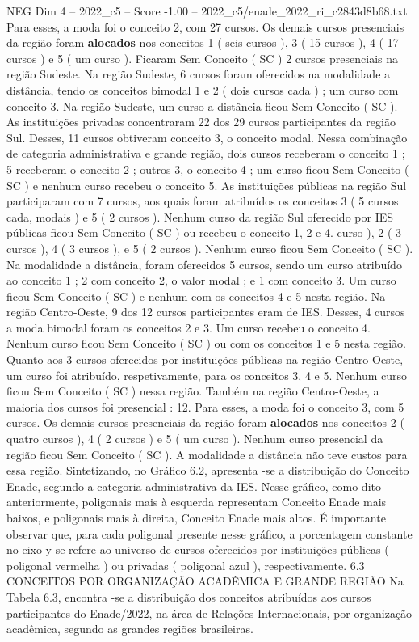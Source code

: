 \begin{textsample}{NEG Dim 4 – 2022\_c5 – Score -1.00 – 2022\_c5/enade\_2022\_ri\_c2843d8b68.txt}
Para esses, a moda foi o conceito 2, com 27 cursos.
Os demais cursos presenciais da região foram \textbf{alocados} nos conceitos 1 ( seis cursos ), 3 ( 15 cursos ), 4 ( 17 cursos ) e 5 ( um curso ).
Ficaram Sem Conceito ( SC ) 2 cursos presenciais na região Sudeste.
Na região Sudeste, 6 cursos foram oferecidos na modalidade a distância, tendo os conceitos bimodal 1 e 2 ( dois cursos cada ) ; um curso com conceito 3.
Na região Sudeste, um curso a distância ficou Sem Conceito ( SC ).
As instituições privadas concentraram 22 dos 29 cursos participantes da região Sul.
Desses, 11 cursos obtiveram conceito 3, o conceito modal.
Nessa combinação de categoria administrativa e grande região, dois cursos receberam o conceito 1 ; 5 receberam o conceito 2 ; outros 3, o conceito 4 ; um curso ficou Sem Conceito ( SC ) e nenhum curso recebeu o conceito 5.
As instituições públicas na região Sul participaram com 7 cursos, aos quais foram atribuídos os conceitos 3 ( 5 cursos cada, modais ) e 5 ( 2 cursos ).
Nenhum curso da região Sul oferecido por IES públicas ficou Sem Conceito ( SC ) ou recebeu o conceito 1, 2 e 4. curso ), 2 ( 3 cursos ), 4 ( 3 cursos ), e 5 ( 2 cursos ).
Nenhum curso ficou Sem Conceito ( SC ).
Na modalidade a distância, foram oferecidos 5 cursos, sendo um curso atribuído ao conceito 1 ; 2 com conceito 2, o valor modal ; e 1 com conceito 3.
Um curso ficou Sem Conceito ( SC ) e nenhum com os conceitos 4 e 5 nesta região.
Na região Centro-Oeste, 9 dos 12 cursos participantes eram de IES.
Desses, 4 cursos a moda bimodal foram os conceitos 2 e 3.
Um curso recebeu o conceito 4.
Nenhum curso ficou Sem Conceito ( SC ) ou com os conceitos 1 e 5 nesta região.
Quanto aos 3 cursos oferecidos por instituições públicas na região Centro-Oeste, um curso foi atribuído, respetivamente, para os conceitos 3, 4 e 5.
Nenhum curso ficou Sem Conceito ( SC ) nessa região.
Também na região Centro-Oeste, a maioria dos cursos foi presencial : 12.
Para esses, a moda foi o conceito 3, com 5 cursos.
Os demais cursos presenciais da região foram \textbf{alocados} nos conceitos 2 ( quatro cursos ), 4 ( 2 cursos ) e 5 ( um curso ).
Nenhum curso presencial da região ficou Sem Conceito ( SC ).
A modalidade a distância não teve custos para essa região.
Sintetizando, no Gráfico 6.2, apresenta -se a distribuição do Conceito Enade, segundo a categoria administrativa da IES.
Nesse gráfico, como dito anteriormente, poligonais mais à esquerda representam Conceito Enade mais baixos, e poligonais mais à direita, Conceito Enade mais altos.
É importante observar que, para cada poligonal presente nesse gráfico, a porcentagem constante no eixo y se refere ao universo de cursos oferecidos por instituições públicas ( poligonal vermelha ) ou privadas ( poligonal azul ), respectivamente. 6.3 CONCEITOS POR ORGANIZAÇÃO ACADÊMICA E GRANDE REGIÃO Na Tabela 6.3, encontra -se a distribuição dos conceitos atribuídos aos cursos participantes do Enade/2022, na área de Relações Internacionais, por organização acadêmica, segundo as grandes regiões brasileiras.

\end{textsample}
